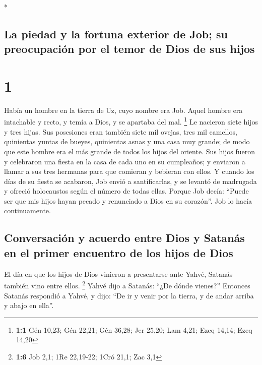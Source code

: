 \begin{paracol}{2} \switchcolumn[0]*

\hypertarget{la-piedad-y-la-fortuna-exterior-de-job-su-preocupaciuxf3n-por-el-temor-de-dios-de-sus-hijos}{%
\subsection{La piedad y la fortuna exterior de Job; su preocupación por
el temor de Dios de sus
hijos}\label{la-piedad-y-la-fortuna-exterior-de-job-su-preocupaciuxf3n-por-el-temor-de-dios-de-sus-hijos}}

\hypertarget{section}{%
\section{1}\label{section}}

 Había un hombre en la tierra de Uz, cuyo nombre era Job.
Aquel hombre era intachable y recto, y temía a Dios, y se apartaba del
mal. \footnote{\textbf{1:1} Gén 10,23; Gén 22,21; Gén 36,28; Jer 25,20;
  Lam 4,21; Ezeq 14,14; Ezeq 14,20}  Le nacieron siete
hijos y tres hijas.  Sus posesiones eran también siete mil
ovejas, tres mil camellos, quinientas yuntas de bueyes, quinientas asnas
y una casa muy grande; de modo que este hombre era el más grande de
todos los hijos del oriente.  Sus hijos fueron y
celebraron una fiesta en la casa de cada uno en su cumpleaños; y
enviaron a llamar a sus tres hermanas para que comieran y bebieran con
ellos.  Y cuando los días de su fiesta se acabaron, Job
envió a santificarlas, y se levantó de madrugada y ofreció holocaustos
según el número de todas ellas. Porque Job decía: ``Puede ser que mis
hijos hayan pecado y renunciado a Dios en su corazón''. Job lo hacía
continuamente.

\hypertarget{conversaciuxf3n-y-acuerdo-entre-dios-y-satanuxe1s-en-el-primer-encuentro-de-los-hijos-de-dios}{%
\subsection{Conversación y acuerdo entre Dios y Satanás en el primer
encuentro de los hijos de
Dios}\label{conversaciuxf3n-y-acuerdo-entre-dios-y-satanuxe1s-en-el-primer-encuentro-de-los-hijos-de-dios}}

 El día en que los hijos de Dios vinieron a presentarse
ante Yahvé, Satanás también vino entre ellos. \footnote{\textbf{1:6} Job
  2,1; 1Re 22,19-22; 1Cró 21,1; Zac 3,1}  Yahvé dijo a
Satanás: ``¿De dónde vienes?'' Entonces Satanás respondió a Yahvé, y
dijo: ``De ir y venir por la tierra, y de andar arriba y abajo en
ella''.


\end{paracol}
